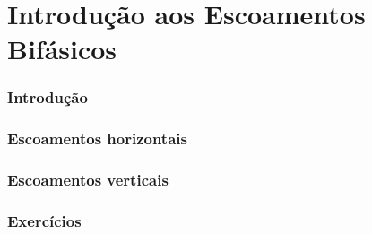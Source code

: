 \documentclass[a4paper,fleqn,12pt,twoside]{report} %
\begin{document}
 
\chapter{Introdu\c c\~ao aos Escoamentos Bif\'asicos}

\subsection{Introdu\c c\~ao}
\subsection{Escoamentos horizontais}
\subsection{Escoamentos verticais}
\subsection{Exerc\'icios}





\end{document}
